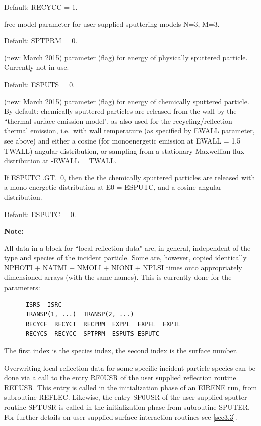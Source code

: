 \begin{description}
\begin{description}
                Default: RECYCC = 1.
        \end{description}
  \item[SPTPRM] free model parameter for user supplied sputtering models N=3,
        M=3.

        Default: SPTPRM = 0.
  \item[ESPUTS] (new: March 2015) parameter (flag) for energy of physically
        sputtered particle.
        Currently not in use.

        Default: ESPUTS = 0.
  \item[ESPUTC] (new: March 2015) parameter (flag) for energy of chemically
        sputtered particle.
        By default: chemically sputtered particles are released from the wall by the
        ``thermal surface emission model", as also used for the recycling/reflection
        thermal emission, i.e.\ with wall temperature (as specified by EWALL parameter,
        see above) and either a cosine (for monoenergetic emission at EWALL = 1.5
        TWALL) angular distribution, or sampling from a stationary Maxwellian flux
        distribution at -EWALL = TWALL.

        If ESPUTC .GT.\ 0, then the the chemically sputtered particles are released
        with a mono-energetic distribution at E0 = ESPUTC, and a cosine angular
        distribution.

        Default: ESPUTC = 0.
\end{description}

\textbf{Note:} 

All data in a block for ``local reflection data" are, in general, independent
of the type and species of the incident particle.
Some are, however, copied identically NPHOTI + NATMI + NMOLI + NIONI + NPLSI
times onto appropriately dimensioned arrays (with the same names).
This is currently done for the parameters:

\begin{lstlisting}
      ISRS  ISRC
      TRANSP(1, ...)  TRANSP(2, ...)
      RECYCF  RECYCT  RECPRM  EXPPL  EXPEL  EXPIL
      RECYCS  RECYCC  SPTPRM  ESPUTS ESPUTC
\end{lstlisting}

The first index is the species index, the second index is the surface number.

Overwriting local reflection data for some specific incident particle species
can be done via a call to the entry RF0USR of the user supplied reflection
routine REFUSR.
This entry is called in the initialization phase of an EIRENE run, from
subroutine REFLEC.
Likewise, the entry SP0USR of the user supplied sputter routine SPTUSR is
called in the initialization phase from subroutine SPUTER.
For further details on user supplied surface interaction routines see
\cref{sec3.3}.

